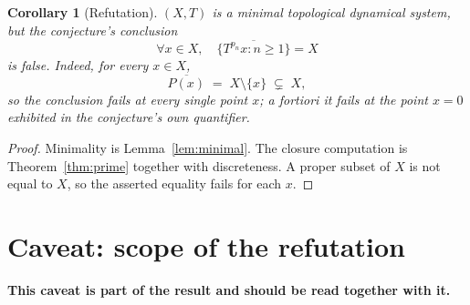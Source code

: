 \documentclass[11pt]{article}
\newtheorem{corollary}[theorem]{Corollary}
\theoremstyle{definition}
\theoremstyle{remark}
\begin{document}
\begin{corollary}[Refutation]
\label{cor:refute}
$(X,T)$ is a minimal topological dynamical system, but the conjecture's
conclusion
\[
\forall x \in X,\quad \overline{\{T^{p_n}x : n \ge 1\}} = X
\]
is false. Indeed, for every $x \in X$,
\[
\overline{P(x)} \;=\; X \setminus \{x\} \;\subsetneq\; X ,
\]
so the conclusion fails at every single point $x$; a fortiori it fails at the
point $x = 0$ exhibited in the conjecture's own quantifier.
\end{corollary}

\begin{proof}
Minimality is Lemma~\ref{lem:minimal}. The closure computation is
Theorem~\ref{thm:prime} together with discreteness. A proper subset of $X$ is
not equal to $X$, so the asserted equality fails for each $x$.
\end{proof}

\section{Caveat: scope of the refutation}
\label{sec:caveat}

\noindent\textbf{This caveat is part of the result and should be read
together with it.}
\end{document}
